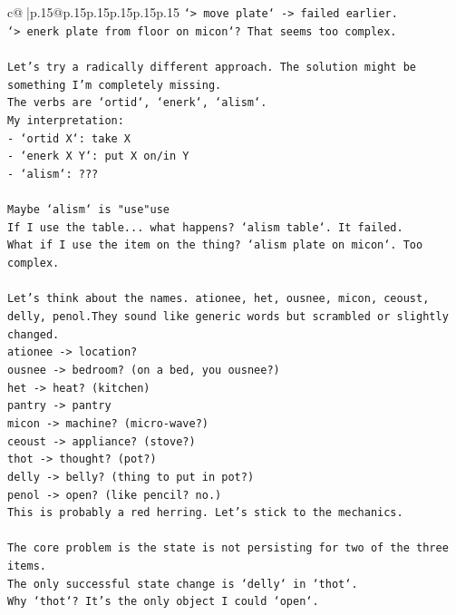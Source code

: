 \documentclass{article}
\begin{document}
{\begin{supertabular}{c@{$\;$}|p{.15\linewidth}@{}p{.15\linewidth}p{.15\linewidth}p{.15\linewidth}p{.15\linewidth}p{.15\linewidth}}
{{{\texttt{`> move plate` {-}> failed earlier.} \\
\texttt{`> enerk plate from floor on micon`? That seems too complex.} \\
\\ 
\texttt{Let's try a radically different approach. The solution might be something I'm completely missing.} \\
\texttt{The verbs are `ortid`, `enerk`, `alism`.} \\
\texttt{My interpretation:} \\
\texttt{{-} `ortid X`: take X} \\
\texttt{{-} `enerk X Y`: put X on/in Y} \\
\texttt{{-} `alism`: ???} \\
\\ 
\texttt{Maybe `alism` is "use"use} \\
\texttt{If I use the table... what happens? `alism table`. It failed.} \\
\texttt{What if I use the item on the thing? `alism plate on micon`. Too complex.} \\
\\ 
\texttt{Let's think about the names. ationee, het, ousnee, micon, ceoust, delly, penol.They sound like generic words but scrambled or slightly changed.} \\
\texttt{ationee {-}> location?} \\
\texttt{ousnee {-}> bedroom? (on a bed, you ousnee?)} \\
\texttt{het {-}> heat? (kitchen)} \\
\texttt{pantry {-}> pantry} \\
\texttt{micon {-}> machine? (micro{-}wave?)} \\
\texttt{ceoust {-}> appliance? (stove?)} \\
\texttt{thot {-}> thought? (pot?)} \\
\texttt{delly {-}> belly? (thing to put in pot?)} \\
\texttt{penol {-}> open? (like pencil? no.)} \\
\texttt{This is probably a red herring. Let's stick to the mechanics.} \\
\\ 
\texttt{The core problem is the state is not persisting for two of the three items.} \\
\texttt{The only successful state change is `delly` in `thot`.} \\
\texttt{Why `thot`? It's the only object I could `open`.} \\
}}}
\end{supertabular}}
\end{document}
